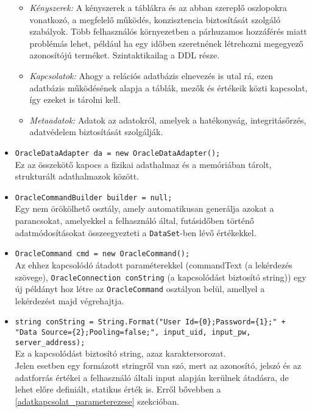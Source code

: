 \begin{itemize}
\begin{itemize}
		\item\textit{ Kényszerek:} A kényszerek a táblákra és az abban szereplő oszlopokra vonatkozó, a megfelelő működés, konzisztencia biztosítását szolgáló szabályok. Több felhasználós környezetben a párhuzamos hozzáférés miatt problémás lehet, például ha egy időben szeretnének létrehozni megegyező azonosítójú terméket. Szintaktikailag a DDL része.
		\item \textit{Kapcsolatok:} Ahogy a relációs adatbázis elnevezés is utal rá, ezen adatbázis működésének alapja a táblák, mezők és értékeik közti kapcsolat, így ezeket is tárolni kell.
		\item \textit{Metaadatok:} Adatok az adatokról, amelyek a hatékonyság, integritásőrzés, adatvédelem biztosítását szolgálják.		
		\end{itemize}

	\item \texttt{OracleDataAdapter da = new OracleDataAdapter();}
		\\Ez az összekötő kapocs a fizikai adathalmaz és a memóriában tárolt, strukturált adathalmazok között.

	\item \texttt{OracleCommandBuilder builder = null;}
		\\Egy nem örökölhető osztály, amely automatikusan generálja azokat a parancsokat, amelyekkel a felhasználó által, futásidőben történő adatmódosításokat összeegyezteti a \texttt{DataSet}-ben lévő értékekkel.
	
	\item \texttt{OracleCommand cmd = new OracleCommand();}
		\\Az ehhez kapcsolódó átadott paraméterekkel (commandText (a lekérdezés szövege), \texttt{OracleConnection conString} (a kapcsolódást biztosító string)) egy új példányt hoz létre az \texttt{OracleCommand} osztályon belül, amellyel a lekérdezést majd végrehajtja.

	\item \texttt{string conString = String.Format("User Id=\{0\};Password=\{1\};" + "Data Source=\{2\};Pooling=false;", input\_uid, input\_pw, server\_address);}
		\\Ez a kapcsolódást biztosító string, azaz karaktersorozat.
		\\Jelen esetben egy formázott stringről van szó, mert az azonosító, jelszó és az adatforrás értékei a felhasználó általi input alapján kerülnek átadásra, de lehet előre definiált, statikus érték is. Erről bővebben a \ref{adatkapcsolat_parameterezese} szekcióban.


\end{itemize}
